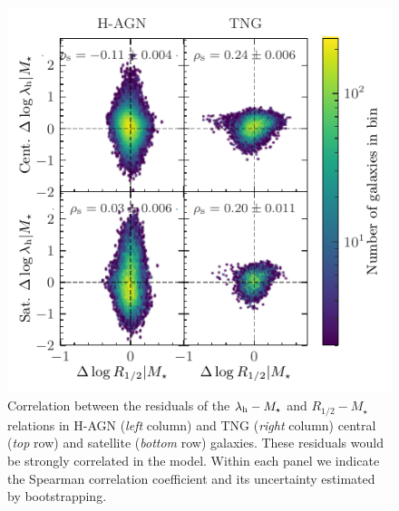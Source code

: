 \documentclass[usenatbib,useAMS]{mnras}
\newcommand{\hd}[1]{\textcolor{purple}{[{\bf HD says}: #1]}}
\begin{document}
\begin{figure}
    \centering
    \includegraphics[width=\columnwidth]{Figures/ReffSpin_residuals_corr.pdf}
    \caption{Correlation between the residuals of the $\lambda_{\rm h}-M_\star$ and $R_{1/2}-M_\star$ relations in H-AGN (\emph{left} column) and TNG (\emph{right} column) central (\emph{top} row) and satellite (\emph{bottom} row) galaxies. These residuals would be strongly correlated in the \citet{MMW_1998} model. Within each panel we indicate the Spearman correlation coefficient and its uncertainty estimated by bootstrapping.
    }
    \label{fig:spin_galaxysizeCorr}
\end{figure}
\end{document}
